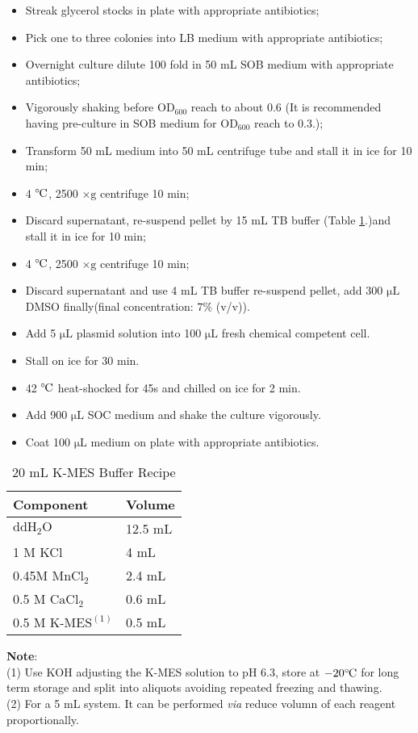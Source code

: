 \documentclass[a4paper, twocolumn]{article}
\def\celsius{\ensuremath{^\circ\hspace{-0.09em}\mathrm{C}}}
\newcommand{\ul}{\mathrm{\mu L}}
\begin{document}
\begin{itemize}
    \item Streak glycerol stocks in plate with appropriate antibiotics;
    \item Pick one to three colonies into LB medium with appropriate antibiotics;
    \item Overnight culture dilute 100 fold in 50 mL SOB medium with appropriate antibiotics;
    \item Vigorously shaking before $\mathrm{OD_{600}}$ reach to about 0.6 (It is recommended having pre-culture in SOB medium for $\mathrm{OD_{600}}$ reach to 0.3.);
    \item Transform 50 mL medium into 50 mL centrifuge tube and stall it in ice for 10 min;
    \item 4 $\celsius$, 2500 $\mathrm{\times g}$ centrifuge 10 min;
    \item Discard supernatant, re-suspend pellet by 15 mL TB buffer (Table \ref{ta1}.)and stall it in ice for 10 min;
    \item 4 $\celsius$, 2500 $\mathrm{\times g}$ centrifuge 10 min;
    \item Discard supernatant and use 4 mL TB buffer re-suspend pellet, add 300 $\mathrm{\mu L}$ DMSO finally(final concentration: $7\%$ (v/v)).
    \item Add 5 $\ul$  plasmid solution into 100 $\ul$ fresh chemical competent cell.
    \item Stall on ice for 30 min.
    \item 42 $\celsius$ heat-shocked for 45s and chilled on ice for 2 min.
    \item Add 900 $\ul$ SOC medium and shake the culture vigorously.
    \item Coat 100 $\ul$ medium on plate with appropriate antibiotics.
\end{itemize}

\begin{table}[H]
    \centering
    \begin{tabular}{ll}
        \toprule
        Component & Volume \\
        \midrule
        $\mathrm{ddH_2O}$ & 12.5 mL \\
        1 M KCl & 4 mL \\
        0.45M $\mathrm{MnCl_2} $ & 2.4 mL \\
        0.5 M $\mathrm{CaCl_2}$ & 0.6 mL \\
        0.5 M $\textrm{K-MES}^{(1)}$ & 0.5 mL  \\
        \bottomrule
    \end{tabular}
    \caption{20 mL K-MES Buffer Recipe}
    \label{ta1}
\end{table}
\textbf{Note}: \\
(1) Use KOH adjusting the K-MES solution to pH 6.3, store at $- 20 \celsius$ for long term storage and split into aliquots avoiding repeated freezing and thawing. \\
(2) For a 5 mL system. It can be performed \emph{via} reduce volumn of each reagent proportionally. 
 



\end{document}
